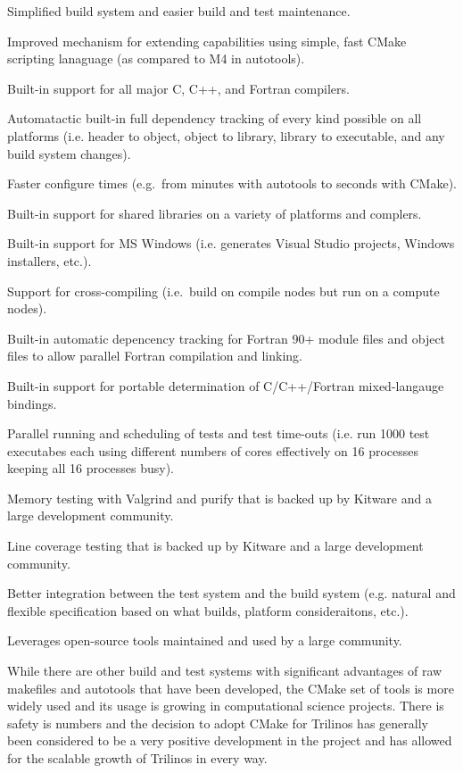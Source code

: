 \documentclass[10pt]{article}
\begin{document}
\begin{compactitem}
\item Simplified build system and easier build and test maintenance.
\item Improved mechanism for extending capabilities using simple, fast CMake scripting lanaguage (as compared to M4 in autotools).
\item Built-in support for all major C, C++, and Fortran compilers.
\item Automatactic built-in full dependency tracking of every kind possible on all platforms (i.e. header to object, object to library, library to executable, and any build system changes).
\item Faster configure times (e.g.\ from minutes with autotools to seconds with CMake).
\item Built-in support for shared libraries on a variety of platforms and complers.
\item Built-in support for MS Windows (i.e. generates Visual Studio projects, Windows installers, etc.).
\item Support for cross-compiling (i.e.\ build on compile nodes but run on a compute nodes).
\item Built-in automatic depencency tracking for Fortran 90+ module files and object files to allow parallel Fortran compilation and linking.
\item Built-in support for portable determination of C/C++/Fortran mixed-langauge bindings.
\item Parallel running and scheduling of tests and test time-outs (i.e. run 1000 test executabes each using different numbers of cores effectively on 16 processes keeping all 16 processes busy).
\item Memory testing with Valgrind and purify that is backed up by Kitware and a large development community.
\item  Line coverage testing that is backed up by Kitware and a large development community.
\item Better integration between the test system and the build system (e.g. natural and flexible specification based on what builds, platform consideraitons, etc.).
\item Leverages open-source tools maintained and used by a large community.
\end{compactitem}

While there are other build and test systems with significant advantages of raw makefiles and autotools that have been developed, the CMake set of tools is more widely used and its usage is growing in computational science projects.  There is safety is numbers and the decision to adopt CMake for Trilinos has generally been considered to be a very positive development in the project and has allowed for the scalable growth of Trilinos in every way.
\end{document}
